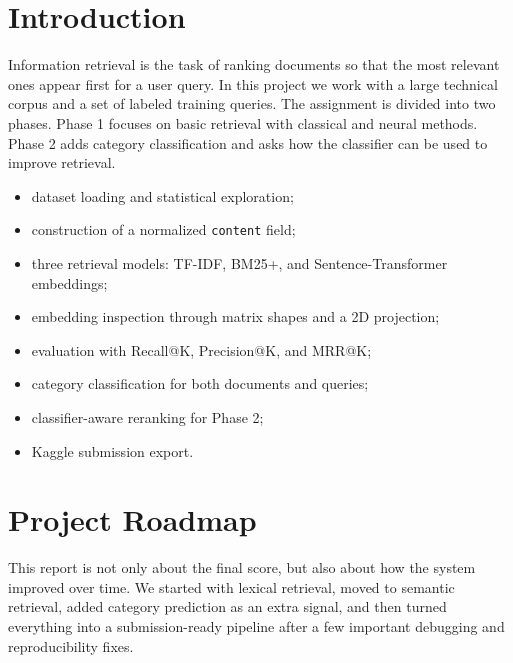 \documentclass[11pt,a4paper]{article}
\begin{document}
\section{Introduction}

Information retrieval is the task of ranking documents so that the most relevant ones appear first for a user query. In this project we work with a large technical corpus and a set of labeled training queries. The assignment is divided into two phases. Phase 1 focuses on basic retrieval with classical and neural methods. Phase 2 adds category classification and asks how the classifier can be used to improve retrieval.

\begin{itemize}
    \item dataset loading and statistical exploration;
    \item construction of a normalized \texttt{content} field;
    \item three retrieval models: TF-IDF, BM25+, and Sentence-Transformer embeddings;
    \item embedding inspection through matrix shapes and a 2D projection;
    \item evaluation with Recall@K, Precision@K, and MRR@K;
    \item category classification for both documents and queries;
    \item classifier-aware reranking for Phase 2;
    \item Kaggle submission export.
\end{itemize}

\section{Project Roadmap}

This report is not only about the final score, but also about how the system improved over time. We started with lexical retrieval, moved to semantic retrieval, added category prediction as an extra signal, and then turned everything into a submission-ready pipeline after a few important debugging and reproducibility fixes.
\end{document}
